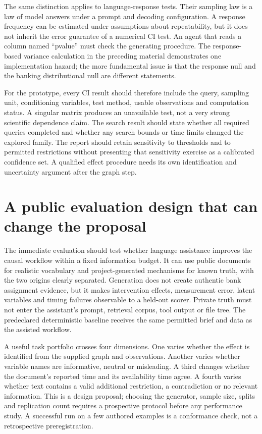 The same distinction applies to language-response tests. Their sampling law is
a law of model answers under a prompt and decoding configuration. A response
frequency can be estimated under assumptions about repeatability, but it does
not inherit the error guarantee of a numerical CI test. An agent that reads a
column named ``pvalue'' must check the generating procedure. The response-based
variance calculation in the preceding material demonstrates one implementation
hazard; the more fundamental issue is that the response null and the banking
distributional null are different statements.

For the prototype, every CI result should therefore include the query, sampling
unit, conditioning variables, test method, usable observations and computation
status. A singular matrix produces an unavailable test, not a very strong
scientific dependence claim. The search result should state whether all
required queries completed and whether any search bounds or time limits
changed the explored family. The report should retain sensitivity to thresholds
and to permitted restrictions without presenting that sensitivity exercise as
a calibrated confidence set. A qualified effect procedure needs its own
identification and uncertainty argument after the graph step.

\section{A public evaluation design that can change the proposal}

The immediate evaluation should test whether language assistance improves the
causal workflow within a fixed information budget. It can use public documents
for realistic vocabulary and project-generated mechanisms for known truth,
with the two origins clearly separated. Generation does not create authentic
bank assignment evidence, but it makes intervention effects, measurement error,
latent variables and timing failures observable to a held-out scorer. Private
truth must not enter the assistant's prompt, retrieval corpus, tool output or
file tree. The predeclared deterministic baseline receives the same permitted
brief and data as the assisted workflow.

A useful task portfolio crosses four dimensions. One varies whether the effect
is identified from the supplied graph and observations. Another varies whether
variable names are informative, neutral or misleading. A third changes whether
the document's reported time and its availability time agree. A fourth varies
whether text contains a valid additional restriction, a contradiction or no
relevant information. This is a design proposal; choosing the generator, sample
size, splits and replication count requires a prospective protocol before any
performance study. A successful run on a few authored examples is a conformance
check, not a retrospective preregistration.

